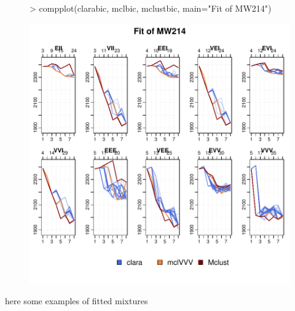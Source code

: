 \begin{figure}[h!]
\begin{Schunk}
\begin{Sinput}
>     compplot(clarabic, mclbic, mclustbic, main="Fit of MW214")
\end{Sinput}
\end{Schunk}
\includegraphics{chapter3-figMW214bic}
\end{figure}

here some examples of fitted mixtures

